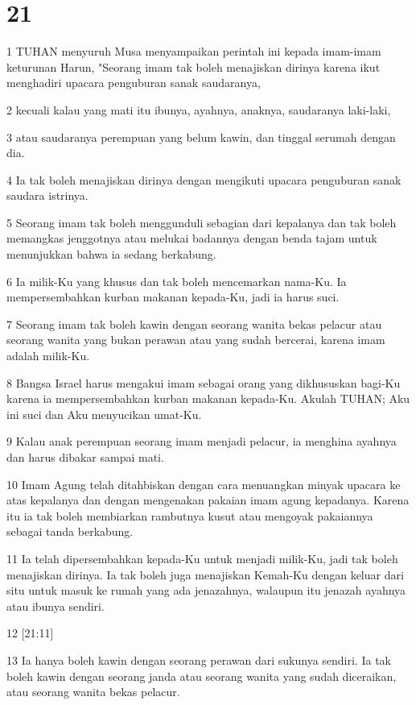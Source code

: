 \chapter{21}

\par 1 TUHAN menyuruh Musa menyampaikan perintah ini kepada imam-imam keturunan Harun, "Seorang imam tak boleh menajiskan dirinya karena ikut menghadiri upacara penguburan sanak saudaranya,
\par 2 kecuali kalau yang mati itu ibunya, ayahnya, anaknya, saudaranya laki-laki,
\par 3 atau saudaranya perempuan yang belum kawin, dan tinggal serumah dengan dia.
\par 4 Ia tak boleh menajiskan dirinya dengan mengikuti upacara penguburan sanak saudara istrinya.
\par 5 Seorang imam tak boleh menggunduli sebagian dari kepalanya dan tak boleh memangkas jenggotnya atau melukai badannya dengan benda tajam untuk menunjukkan bahwa ia sedang berkabung.
\par 6 Ia milik-Ku yang khusus dan tak boleh mencemarkan nama-Ku. Ia mempersembahkan kurban makanan kepada-Ku, jadi ia harus suci.
\par 7 Seorang imam tak boleh kawin dengan seorang wanita bekas pelacur atau seorang wanita yang bukan perawan atau yang sudah bercerai, karena imam adalah milik-Ku.
\par 8 Bangsa Israel harus mengakui imam sebagai orang yang dikhususkan bagi-Ku karena ia mempersembahkan kurban makanan kepada-Ku. Akulah TUHAN; Aku ini suci dan Aku menyucikan umat-Ku.
\par 9 Kalau anak perempuan seorang imam menjadi pelacur, ia menghina ayahnya dan harus dibakar sampai mati.
\par 10 Imam Agung telah ditahbiskan dengan cara menuangkan minyak upacara ke atas kepalanya dan dengan mengenakan pakaian imam agung kepadanya. Karena itu ia tak boleh membiarkan rambutnya kusut atau mengoyak pakaiannya sebagai tanda berkabung.
\par 11 Ia telah dipersembahkan kepada-Ku untuk menjadi milik-Ku, jadi tak boleh menajiskan dirinya. Ia tak boleh juga menajiskan Kemah-Ku dengan keluar dari situ untuk masuk ke rumah yang ada jenazahnya, walaupun itu jenazah ayahnya atau ibunya sendiri.
\par 12 [21:11]
\par 13 Ia hanya boleh kawin dengan seorang perawan dari sukunya sendiri. Ia tak boleh kawin dengan seorang janda atau seorang wanita yang sudah diceraikan, atau seorang wanita bekas pelacur.
